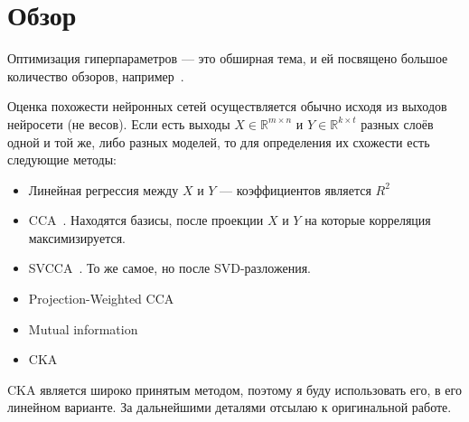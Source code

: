 \section{Обзор}
Оптимизация гиперпараметров --- это обширная тема, и ей посвящено большое количество обзоров, например~\cite{yu2020hyper}.

Оценка похожести нейронных сетей осуществляется обычно исходя из выходов нейросети (не весов).
Если есть выходы $X \in \mathbb{R}^{m\times n}$ и $Y \in \mathbb{R}^{k\times t}$ разных слоёв одной и той же, либо разных моделей, то для определения их схожести есть следующие методы:
\begin{itemize}
    \item Линейная регрессия между $X$ и $Y$ --- коэффициентов является $R^2$
    \item CCA~\cite{ramsay1984matrix}. Находятся базисы, после проекции $X$ и $Y$ на которые корреляция максимизируется.
    \item SVCCA~\cite{golub1995canonical}. То же самое, но после SVD-разложения.
    \item Projection-Weighted CCA~\cite{morcos2018insights}
    \item Mutual information
    \item CKA~\cite{kornblith2019similarity}
\end{itemize}

CKA является широко принятым методом, поэтому я буду использовать его, в его линейном варианте.
За дальнейшими деталями отсылаю к оригинальной работе.